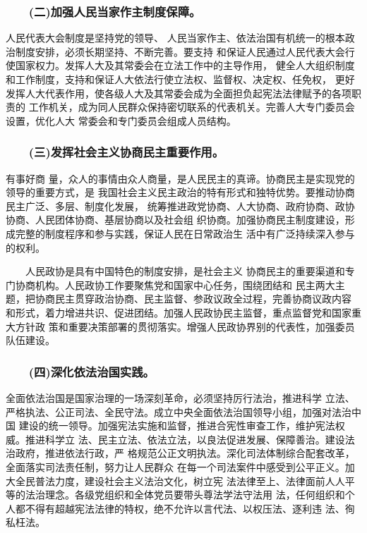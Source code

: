 \documentclass[11pt]{ctexart}
\begin{document}
{{{{\subsubsection{　　(二)加强人民当家作主制度保障。}
\label{sec:org501922d}

人民代表大会制度是坚持党的领导、
人民当家作主、依法治国有机统一的根本政治制度安排，必须长期坚持、不断完善。要支持
和保证人民通过人民代表大会行使国家权力。发挥人大及其常委会在立法工作中的主导作用，
健全人大组织制度和工作制度，支持和保证人大依法行使立法权、监督权、决定权、任免权，
更好发挥人大代表作用，使各级人大及其常委会成为全面担负起宪法法律赋予的各项职责的
工作机关，成为同人民群众保持密切联系的代表机关。完善人大专门委员会设置，优化人大
常委会和专门委员会组成人员结构。

\subsubsection{　　(三)发挥社会主义协商民主重要作用。}
\label{sec:orgf6b7d0a}

有事好商
量，众人的事情由众人商量，是人民民主的真谛。协商民主是实现党的领导的重要方式，是
我国社会主义民主政治的特有形式和独特优势。要推动协商民主广泛、多层、制度化发展，
统筹推进政党协商、人大协商、政府协商、政协协商、人民团体协商、基层协商以及社会组
织协商。加强协商民主制度建设，形成完整的制度程序和参与实践，保证人民在日常政治生
活中有广泛持续深入参与的权利。

　　人民政协是具有中国特色的制度安排，是社会主义
协商民主的重要渠道和专门协商机构。人民政协工作要聚焦党和国家中心任务，围绕团结和
民主两大主题，把协商民主贯穿政治协商、民主监督、参政议政全过程，完善协商议政内容
和形式，着力增进共识、促进团结。加强人民政协民主监督，重点监督党和国家重大方针政
策和重要决策部署的贯彻落实。增强人民政协界别的代表性，加强委员队伍建设。

\subsubsection{　　(四)深化依法治国实践。}
\label{sec:org5816011}

全面依法治国是国家治理的一场深刻革命，必须坚持厉行法治，推进科学
立法、严格执法、公正司法、全民守法。成立中央全面依法治国领导小组，加强对法治中国
建设的统一领导。加强宪法实施和监督，推进合宪性审查工作，维护宪法权威。推进科学立
法、民主立法、依法立法，以良法促进发展、保障善治。建设法治政府，推进依法行政，严
格规范公正文明执法。深化司法体制综合配套改革，全面落实司法责任制，努力让人民群众
在每一个司法案件中感受到公平正义。加大全民普法力度，建设社会主义法治文化，树立宪
法法律至上、法律面前人人平等的法治理念。各级党组织和全体党员要带头尊法学法守法用
法，任何组织和个人都不得有超越宪法法律的特权，绝不允许以言代法、以权压法、逐利违
法、徇私枉法。

}}}}
\end{document}
